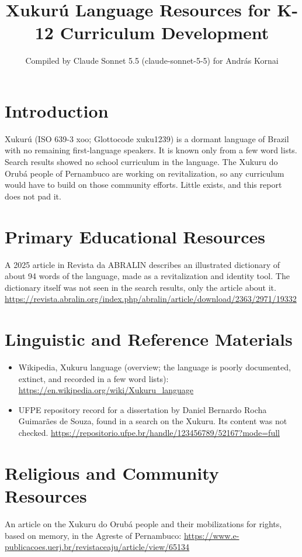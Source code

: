 \documentclass[12pt]{article}
\title{Xukur\'u Language Resources for K-12 Curriculum Development}
\author{Compiled by Claude Sonnet 5.5 (claude-sonnet-5-5) for Andr\'as Kornai}
\date{}
\begin{document}
\maketitle
\section{Introduction}
Xukur\'u (ISO 639-3 xoo; Glottocode xuku1239) is a dormant language of Brazil with no remaining first-language speakers. It is known only from a few word lists. Search results showed no school curriculum in the language. The Xukuru do Orub\'a people of Pernambuco are working on revitalization, so any curriculum would have to build on those community efforts. Little exists, and this report does not pad it.

\section{Primary Educational Resources}
A 2025 article in Revista da ABRALIN describes an illustrated dictionary of about 94 words of the language, made as a revitalization and identity tool. The dictionary itself was not seen in the search results, only the article about it. \url{https://revista.abralin.org/index.php/abralin/article/download/2363/2971/19332}

\section{Linguistic and Reference Materials}
\begin{itemize}
\item Wikipedia, Xukuru language (overview; the language is poorly documented, extinct, and recorded in a few word lists): \url{https://en.wikipedia.org/wiki/Xukuru_language}
\item UFPE repository record for a dissertation by Daniel Bernardo Rocha Guimar\~aes de Souza, found in a search on the Xukuru. Its content was not checked. \url{https://repositorio.ufpe.br/handle/123456789/52167?mode=full}
\end{itemize}

\section{Religious and Community Resources}
An article on the Xukuru do Orub\'a people and their mobilizations for rights, based on memory, in the Agreste of Pernambuco: \url{https://www.e-publicacoes.uerj.br/revistaceaju/article/view/65134}
\end{document}
